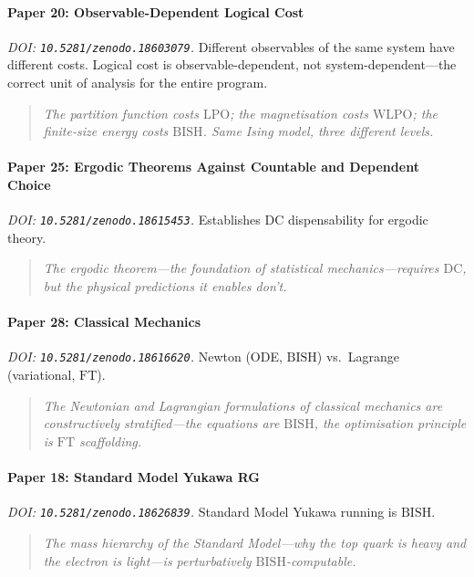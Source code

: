 \documentclass[11pt,a4paper]{report}
\theoremstyle{plain}
\theoremstyle{definition}
\theoremstyle{remark}
\newcommand{\BISH}{\mathrm{BISH}}
\newcommand{\WLPO}{\mathrm{WLPO}}
\newcommand{\LPO}{\mathrm{LPO}}
\newcommand{\FT}{\mathrm{FT}}
\newcommand{\DC}{\mathrm{DC}}
\begin{document}
\paragraph{Paper 20: Observable-Dependent Logical Cost}
\emph{DOI: \texttt{10.5281/zenodo.18603079}.}\quad
Different observables of the same system have different costs.  Logical cost is observable-dependent, not system-dependent---the correct unit of analysis for the entire program.
\begin{quote}\itshape
The partition function costs $\LPO$; the magnetisation costs $\WLPO$; the finite-size energy costs $\BISH$.  Same Ising model, three different levels.
\end{quote}

\paragraph{Paper 25: Ergodic Theorems Against Countable and Dependent Choice}
\emph{DOI: \texttt{10.5281/zenodo.18615453}.}\quad
Establishes $\DC$ dispensability for ergodic theory.
\begin{quote}\itshape
The ergodic theorem---the foundation of statistical mechanics---requires $\DC$, but the physical predictions it enables don't.
\end{quote}

\paragraph{Paper 28: Classical Mechanics}
\emph{DOI: \texttt{10.5281/zenodo.18616620}.}\quad
Newton (ODE, $\BISH$) vs.\ Lagrange (variational, $\FT$).
\begin{quote}\itshape
The Newtonian and Lagrangian formulations of classical mechanics are constructively stratified---the equations are $\BISH$, the optimisation principle is $\FT$ scaffolding.
\end{quote}

\paragraph{Paper 18: Standard Model Yukawa RG}
\emph{DOI: \texttt{10.5281/zenodo.18626839}.}\quad
Standard Model Yukawa running is $\BISH$.
\begin{quote}\itshape
The mass hierarchy of the Standard Model---why the top quark is heavy and the electron is light---is perturbatively $\BISH$-computable.
\end{quote}
\end{document}
